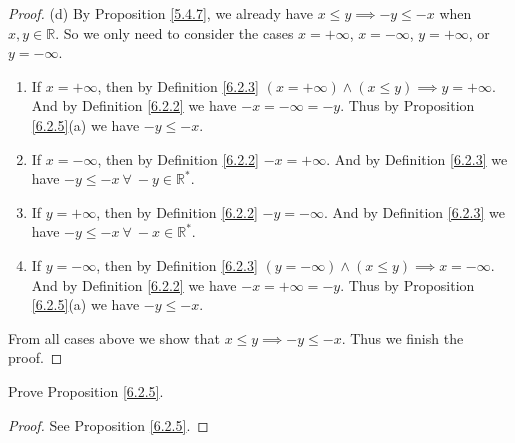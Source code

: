 \begin{proof}{(d)}
By Proposition \ref{5.4.7}, we already have \(x \leq y \implies -y \leq -x\) when \(x, y \in \mathds{R}\).
So we only need to consider the cases \(x = +\infty\), \(x = -\infty\), \(y = +\infty\), or \(y = -\infty\).
\begin{enumerate}[label=(\Roman*)]
    \item If \(x = +\infty\), then by Definition \ref{6.2.3} \((x = +\infty) \land (x \leq y) \implies y = +\infty\).
    And by Definition \ref{6.2.2} we have \(-x = -\infty = -y\).
    Thus by Proposition \ref{6.2.5}(a) we have \(-y \leq -x\).
    \item If \(x = -\infty\), then by Definition \ref{6.2.2} \(-x = +\infty\).
    And by Definition \ref{6.2.3} we have \(-y \leq -x \ \forall\ -y \in \mathds{R}^*\).
    \item If \(y = +\infty\), then by Definition \ref{6.2.2} \(-y = -\infty\).
    And by Definition \ref{6.2.3} we have \(-y \leq -x \ \forall\ -x \in \mathds{R}^*\).
    \item If \(y = -\infty\), then by Definition \ref{6.2.3} \((y = -\infty) \land (x \leq y) \implies x = -\infty\).
    And by Definition \ref{6.2.2} we have \(-x = +\infty = -y\).
    Thus by Proposition \ref{6.2.5}(a) we have \(-y \leq -x\).
\end{enumerate}
From all cases above we show that \(x \leq y \implies -y \leq -x\).
Thus we finish the proof.
\end{proof}

\exercisesection

\begin{exercise}\label{ex 6.2.1}
Prove Proposition \ref{6.2.5}.
\end{exercise}

\begin{proof}
See Proposition \ref{6.2.5}.
\end{proof}
